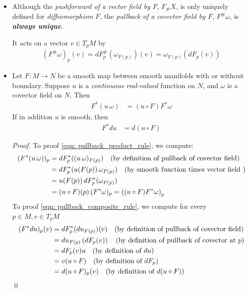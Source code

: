 \documentclass[11pt]{article}
\begin{document}
\begin{itemize}
\item \begin{remark}
Although the \emph{pushforward of a vector field by $F$}, $F_{\#}X$, is only uniquely defined for \emph{diffeomorphism} $F$, the \emph{pullback of a covector field by $F$}, $F^{\#}\omega$, is \textbf{\emph{always unique}}.    

It acts on a vector $v \in T_{p}M$ by
\begin{align*}
(F^{\#}\omega)_{p}(v) = dF^{\#}_{p}(\omega_{F(p)})(v) = \omega_{F(p)}(dF_{p}(v)) 
\end{align*}
\end{remark}


\item \begin{proposition} Let $F: M \rightarrow N$ be a smooth map between smooth manifolds with or without boundary. Suppose $u$ is a \emph{continuous real-valued} function on $N$, and $\omega$ is a covector field on $N$. Then
\begin{align}
F^{*}(u\, \omega) &= (u \circ F) F^{*}\omega \label{eqn: pullback_product_rule}
\end{align} If in addition $u$ is smooth, then
\begin{align}
F^{*}du  &=  d(u \circ F) \label{eqn: pullback_composite_rule}
\end{align}
\end{proposition}
\begin{proof}
To proof \eqref{eqn: pullback_product_rule}, we compute:
\begin{align*}
(F^{*}(u\, \omega))_{p} &= dF_{p}^{*}((u \, \omega)_{F(p)}) \quad (\text{by definition of pullback of covector field})\\
&= dF_{p}^{*}(u(F(p)) \, \omega_{F(p)}) \quad (\text{by smooth function times vector field })\\
&= u(F(p)) \, dF_{p}^{*}(\omega_{F(p)}) \\
&= (u \circ F)(p)\, (F^{*}\omega)_{p} = \left( (u \circ F) F^{*}\omega\right)_{p}
\end{align*}
To proof \eqref{eqn: pullback_composite_rule}, we compute for every $p \in M, v\in T_{p}M$
\begin{align*}
(F^{*}du)_{p}(v) &=  dF_{p}^{*}(du_{F(p)})(v) \quad (\text{by definition of pullback of covector field})\\
&= du_{F(p)}\left(dF_{p}(v)\right) \quad (\text{by definition of pullback of covector at $p$})\\
&= dF_{p}(v) u \quad (\text{by definition of $du$})\\
&= v(u \circ F) \quad (\text{by definition of $dF_{p}$})\\
&= d(u \circ F)_{p}(v) \quad (\text{by definition of $d(u \circ F)$})
\end{align*}
\qed
\end{proof}


\end{itemize}
\end{document}
